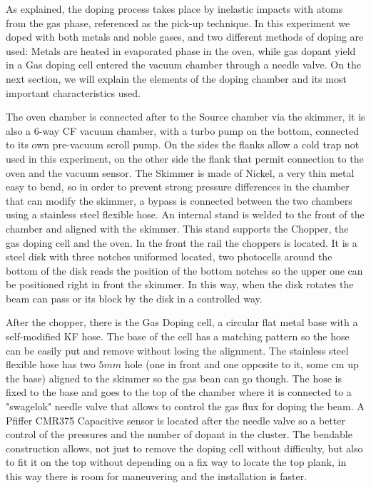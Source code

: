 As explained, the doping process takes place by inelastic impacts with atoms from the gas phase, referenced as the pick-up technique. In this experiment we doped with both metals and noble gases, and two different methods of doping are used: Metals are heated in evaporated phase in the oven, while gas dopant yield in a Gas doping cell entered the vacuum chamber through a needle valve. On the next section, we will explain the elements of the doping chamber and its most important characteristics used.

The oven chamber is connected after to the Source chamber via the skimmer, it is also a 6-way CF vacuum chamber, with a turbo pump on the bottom, connected to its own pre-vacuum scroll pump. On the sides the flanks allow a cold trap not used in this experiment, on the other side the flank that permit connection to the oven and the vacuum sensor. The Skimmer is made of Nickel, a very thin metal easy to bend, so in order to prevent strong pressure differences in the chamber that can modify the skimmer, a bypass is connected between the two chambers using a stainless steel flexible hose.  
An internal stand is welded to the front of the chamber and aligned with the skimmer. This stand supports the Chopper, the gas doping cell and the oven.
In the front the rail the choppers is located.  It is a steel  disk with three notches uniformed located, two photocells around the bottom of the disk reads the position of the bottom notches so the upper one can be positioned right in front the skimmer. In this way, when the disk rotates the beam can pass or its block by the disk in a controlled way.  

After the chopper, there is the Gas Doping cell, a circular flat metal base with a self-modified KF hose. The base of the cell has a matching pattern so the hose can be easily put and remove without losing the alignment. The stainless steel flexible hose has two $5mm$ hole (one in front and one opposite to it, some cm up the base) aligned to the skimmer so the gas bean can go though. The hose is fixed to the base and goes to the top of the chamber where it is connected to a "swagelok" needle valve that allows to control the gas flux for doping the beam. A Pfiffer CMR375 Capacitive sensor is located after the needle valve so a better control of the pressures and the number of dopant in the cluster. The bendable construction allows, not just to remove the doping cell without difficulty, but also to fit it on the top without depending on a fix way to locate the top plank, in this way there is room for maneuvering and the installation is faster.

